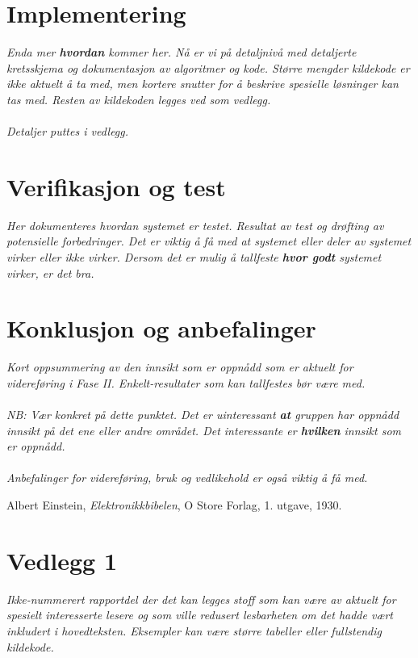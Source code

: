 \documentclass[11pt,norsk]{elsys-teknisk}
\begin{document}
\section{Implementering}
\label{sec:implementering}
\textit{Enda mer \textbf{hvordan} kommer her. Nå er vi på detaljnivå med detaljerte kretsskjema og dokumentasjon av algoritmer og kode. Større mengder kildekode er ikke aktuelt å ta med, men kortere snutter for å beskrive spesielle løsninger kan tas med. Resten av kildekoden legges ved som vedlegg. \\
\\
Detaljer puttes i vedlegg.}

\section{Verifikasjon og test}
\label{sec:verifikasjon}
\textit{Her dokumenteres hvordan systemet er testet. Resultat av test og drøfting av potensielle forbedringer. Det er viktig å få med at systemet eller deler av systemet virker eller ikke virker. Dersom det er mulig å tallfeste \textbf{hvor godt} systemet virker, er det bra.}

\section{Konklusjon og anbefalinger}
\label{sec:konklusjon}
\textit{Kort oppsummering av den innsikt som er oppnådd som er aktuelt for videreføring i Fase II. Enkelt-resultater som kan tallfestes bør være med.\\
\\
NB: Vær konkret på dette punktet. Det er uinteressant \textbf{at} gruppen har oppnådd innsikt på det ene eller andre området. Det interessante er \textbf{hvilken} innsikt som er oppnådd. \\
\\
Anbefalinger for videreføring, bruk og vedlikehold er også viktig å få med.}



{}
\begin{thebibliography}{99}

  Albert Einstein,
  \emph{Elektronikkbibelen},
  O Store Forlag,
  1. utgave,
  1930.

\end{thebibliography}

\appendix

\section{Vedlegg 1}
\label{sec:vedlegg1}
\textit{Ikke-nummerert rapportdel der det kan legges stoff som kan være av aktuelt for spesielt interesserte lesere og som ville redusert lesbarheten om det hadde vært inkludert i hovedteksten. Eksempler kan være større tabeller eller fullstendig kildekode.}
\end{document}
